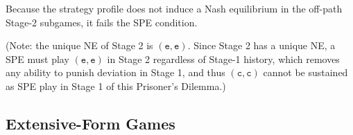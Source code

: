\begin{enumerate}
\begin{solution}
\medskip
\noindent Because the strategy profile does not induce a Nash equilibrium in the off-path Stage-2 subgames, it fails the SPE condition.

\medskip
\noindent (Note: the unique NE of Stage 2 is $(\texttt{e},\texttt{e})$.  Since Stage 2 has a unique NE, a SPE must play $(\texttt{e},\texttt{e})$ in Stage 2 regardless of Stage-1 history, which removes any ability to punish deviation in Stage 1, and thus $(\texttt{c},\texttt{c})$ cannot be sustained as SPE play in Stage 1 of this Prisoner's Dilemma.)
\end{solution}
\clearpage

\end{enumerate}

\clearpage

\subsection{Extensive-Form Games}

